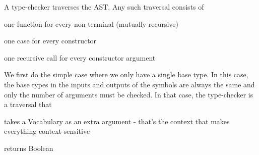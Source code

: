A type-checker traverses the AST. Any such traversal consists of
\begin{compactitem}
 \item one function for every non-terminal (mutually recursive)
 \item one case for every constructor
 \item one recursive call for every constructor argument
\end{compactitem}

We first do the simple case where we only have a single base type.
In this case, the base types in the inputs and outputs of the symbols are always the same and only the number of arguments must be checked.
In that case, the type-checker is a traversal that
\begin{compactitem}
 \item takes a Vocabulary as an extra argument - that's the context that makes everything context-sensitive
 \item returns Boolean
\end{compactitem}

